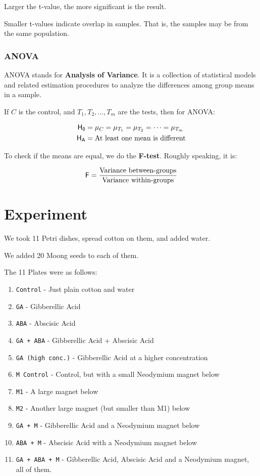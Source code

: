 \documentclass[twocolumn]{article}
\begin{document}
Larger the t-value, the more significant is the result. 

Smaller t-values indicate overlap in samples. That is, the samples may be from the same population. 

\subsubsection{ANOVA}

ANOVA stands for \textbf{Analysis of Variance}. It is a collection of statistical models and related estimation procedures to analyze the differences among group means in a sample. 

If $C$ is the control, and $T_1, T_2, \dots, T_m$ are the tests, then for ANOVA:

\begin{align*}
    \sf H_0 &= \mu_C = \mu_{T_1} = \mu_{T_2} = \dots = \mu_{T_m} \\
    \sf H_A &= \text{At least one mean is different}
\end{align*}

To check if the means are equal, we do the \textbf{F-test}. Roughly speaking, it is:

\[
    \sf F = \frac{\text{Variance between-groups}}{\text{Variance within-groups}}
\]


\section{Experiment}

We took 11 Petri dishes, spread cotton on them, and added water.

We added 20 Moong seeds to each of them. 

The 11 Plates were as follows:

\begin{enumerate}
    \item \texttt{Control} - Just plain cotton and water
    \item \texttt{GA} - Gibberellic Acid 
    \item \texttt{ABA} -  Abscisic Acid
    \item \texttt{GA + ABA} - Gibberellic Acid + Abscisic Acid
    \item \texttt{GA (high conc.)} - Gibberellic Acid at a higher concentration
    \item \texttt{M Control} - Control, but with a small Neodymium magnet below 
    \item \texttt{M1} - A large magnet below 
    \item \texttt{M2} - Another large magnet (but smaller than M1) below 
    \item \texttt{GA + M} - Gibberellic Acid and a Neodymium magnet below
    \item \texttt{ABA + M} - Abscisic Acid with a Neodymium magnet below
    \item \texttt{GA + ABA + M} - Gibberellic Acid, Abscisic Acid and a Neodymium magnet, all of them.
\end{enumerate}
\end{document}
